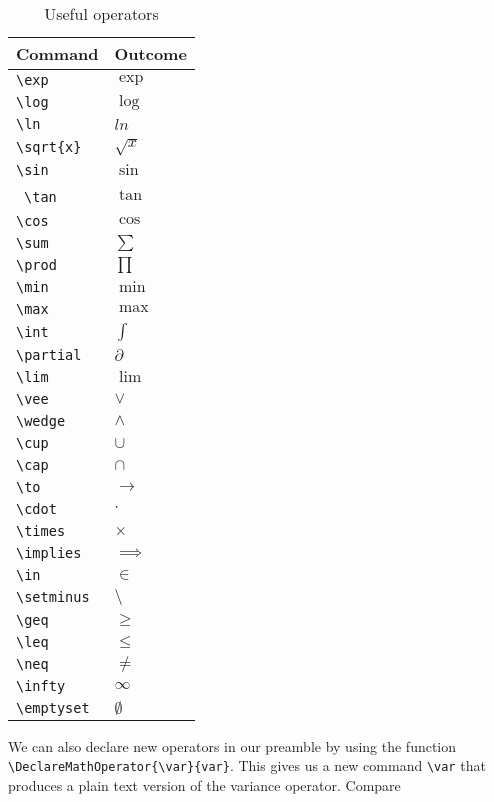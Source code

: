 \begin{table}[h]
	\centering
	\caption{Useful operators}
	\label{tab:operators}
\begin{footnotesize}
    \begin{tabular}{l l}
      \hline
      Command     & Outcome \\ \hline
      \verb|\exp| & $\exp$\\
\verb|\log| & $\log$ \\
\verb|\ln| & $ln$ \\
\verb|\sqrt{x}| & $\sqrt{x}$ \\
\verb|\sin| & $\sin$ \\\
\verb|\tan| & $\tan$ \\
\verb|\cos| & $\cos$\\
\verb|\sum| & $\sum$\\
\verb|\prod| & $\prod$\\
\verb|\min| & $\min$\\
\verb|\max| & $\max$\\
\verb|\int| & $\int$ \\
\verb|\partial| & $\partial$ \\
\verb|\lim| & $\lim$ \\
\verb|\vee| & $\vee$ \\
\verb|\wedge| & $\wedge$ \\
\verb|\cup| & $\cup$ \\
\verb|\cap| & $\cap$ \\
\verb|\to| & $\to$ \\
\verb|\cdot| & $\cdot$ \\
\verb|\times| & $\times$ \\
\verb|\implies| & $\implies$ \\
\verb|\in| & $\in$ \\
\verb|\setminus| & $\setminus$ \\
\verb|\geq| & $\geq$ \\
\verb|\leq| & $\leq$ \\
\verb|\neq| & $\neq$ \\
\verb|\infty| & $\infty$ \\
\verb|\emptyset| & $\emptyset$ \\
\hline
    \end{tabular}
\end{footnotesize} 
\end{table}

We can also declare new operators in our preamble by using the function \verb|\DeclareMathOperator{\var}{var}|. This gives us a new command \verb|\var| that produces a plain text version of the variance operator. Compare

